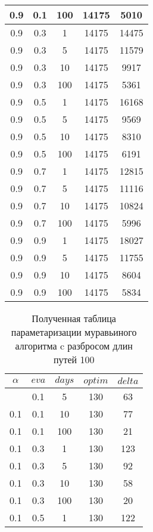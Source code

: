 \begin{appendices}
\begin{longtable}{|c|c|c|c|c|}
		0.9   & 0.1    & 100  & 14175 & 5010  \\ \hline
		0.9   & 0.3    & 1    & 14175 & 14475 \\ \hline
		0.9   & 0.3    & 5    & 14175 & 11579 \\ \hline
		0.9   & 0.3    & 10   & 14175 & 9917  \\ \hline
		0.9   & 0.3    & 100  & 14175 & 5361  \\ \hline
		0.9   & 0.5    & 1    & 14175 & 16168 \\ \hline
		0.9   & 0.5    & 5    & 14175 & 9569  \\ \hline
		0.9   & 0.5    & 10   & 14175 & 8310  \\ \hline
		0.9   & 0.5    & 100  & 14175 & 6191  \\ \hline
		0.9   & 0.7    & 1    & 14175 & 12815 \\ \hline
		0.9   & 0.7    & 5    & 14175 & 11116 \\ \hline
		0.9   & 0.7    & 10   & 14175 & 10824 \\ \hline
		0.9   & 0.7    & 100  & 14175 & 5996  \\ \hline
		0.9   & 0.9    & 1    & 14175 & 18027 \\ \hline
		0.9   & 0.9    & 5    & 14175 & 11755 \\ \hline
		0.9   & 0.9    & 10   & 14175 & 8604  \\ \hline
		0.9   & 0.9    & 100  & 14175 & 5834  \\ \hline
	\end{longtable}
		\begin{longtable}{|c|c|c|c|c|}
		\caption{Полученная таблица параметаризации муравьиного алгоритма c разбросом длин путей 100}\label{t:params_2}\\
		\hline
		$\alpha$ & $eva$ & $days$ & $optim$ & $delta$ \\ \hline
		\endhead
		\endfoot
		0.1   & 0.1    & 5    & 130   & 63    \\ \hline
		0.1   & 0.1    & 10   & 130   & 77    \\ \hline
		0.1   & 0.1    & 100  & 130   & 21    \\ \hline
		0.1   & 0.3    & 1    & 130   & 123   \\ \hline
		0.1   & 0.3    & 5    & 130   & 92    \\ \hline
		0.1   & 0.3    & 10   & 130   & 58    \\ \hline
		0.1   & 0.3    & 100  & 130   & 20    \\ \hline
		0.1   & 0.5    & 1    & 130   & 122   \\ \hline

\end{longtable}
\end{appendices}
